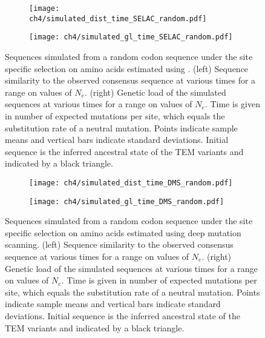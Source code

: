 \begin{figure}[h]
    \centering
    \begin{subfigure}
        \centering
        \texttt{[image: ch4/simulated\_dist\_time\_SELAC\_random.pdf]}
    \end{subfigure}
    \begin{subfigure}
        \centering
        \texttt{[image: ch4/simulated\_gl\_time\_SELAC\_random.pdf]}
    \end{subfigure}
    \caption{Sequences simulated from a random codon sequence under the site specific selection on amino acids estimated using \selac. 
    (left) Sequence similarity to the observed consensus sequence at various times for a range on values of $N_e$.
    (right) Genetic load of the simulated sequences at various times for a range on values of $N_e$.
    Time is given in number of expected mutations per site, which equals the substitution rate of a neutral mutation.
    Points indicate sample means and vertical bars indicate standard deviations. Initial sequence is the inferred ancestral state of the TEM variants and indicated by a black triangle.}
    \label{fig:selac_sim_rand}
\end{figure}

\begin{figure}[h]
    \centering
    \begin{subfigure}
        \centering
        \texttt{[image: ch4/simulated\_dist\_time\_DMS\_random.pdf]}
    \end{subfigure}
    \begin{subfigure}
        \centering
        \texttt{[image: ch4/simulated\_gl\_time\_DMS\_random.pdf]}
    \end{subfigure}
    \caption{Sequences simulated from a random codon sequence under the site specific selection on amino acids estimated using deep mutation scanning. 
    (left) Sequence similarity to the observed consensus sequence at various times for a range on values of $N_e$.
    (right) Genetic load of the simulated sequences at various times for a range on values of $N_e$.
    Time is given in number of expected mutations per site, which equals the substitution rate of a neutral mutation.
    Points indicate sample means and vertical bars indicate standard deviations. Initial sequence is the inferred ancestral state of the TEM variants and indicated by a black triangle.}
    \label{fig:dms_sim_rand}
\end{figure}


